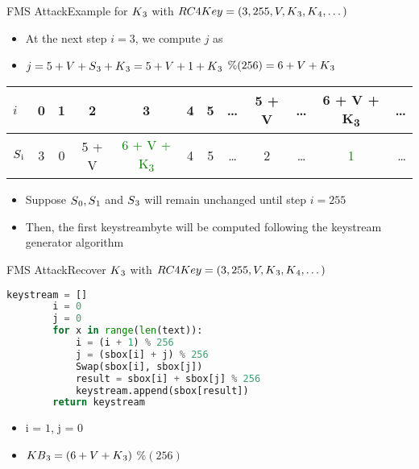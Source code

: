 \documentclass[
	aspectratio=169,	%
	onlytextwidth,		%
	t					%
	]{beamer}
\begin{document}
\begin{frame}[fragile]{FMS Attack}{Example for $K\textsubscript{3}$ with $RC4Key=(3,255,V,K\textsubscript{3},K\textsubscript{4},\dots)$}

	
	\begin{itemize}
		\item At the next step $i = 3$, we compute $j$ as
		\item $j = 5 + V + S\textsubscript{3} + K\textsubscript{3} = 5 + V + 1 + K\textsubscript{3}$ $\%(256) = 6 + V + K\textsubscript{3}$
	\end{itemize}
	
	\begin{table}[h!]
		\begin{center}
			\begin{tabular}{l|c|c|c|c|c|c|c|c|c|c|r}
			$i$ & 0 & 1 & 2 & 3 & 4 & 5 & \dots & 5 + V & \dots & 6 + V + K\textsubscript{3} & \dots\\
			\hline
			$S\textsubscript{i}$ & 3 & 0 & 5 + V & \textcolor{green}{6 + V + K\textsubscript{3}} & 4 & 5 & \dots & 2 & \dots & \textcolor{green}{1} & \dots\\
			\end{tabular}
		\end{center}
	\end{table}

	\begin{itemize}
		\item Suppose $S\textsubscript{0}, S\textsubscript{1}$ and $S\textsubscript{3}$ will remain unchanged until step $i = 255$
		\item Then, the first keystreambyte will be computed following the keystream generator algorithm
	\end{itemize}
\end{frame}

\begin{frame}[fragile]{FMS Attack}{Recover $K\textsubscript{3}$ with $RC4Key=(3,255,V,K\textsubscript{3},K\textsubscript{4},\dots)$}

	\begin{lstlisting}[language=Python]
		keystream = []
		i = 0
		j = 0
		for x in range(len(text)):
			i = (i + 1) % 256
			j = (sbox[i] + j) % 256
			Swap(sbox[i], sbox[j])
			result = sbox[i] + sbox[j] % 256
			keystream.append(sbox[result])   
		return keystream   
	\end{lstlisting}
	\begin{itemize}
		\item i = $1$, j = $0$
		\item $KB\textsubscript{3} = (6 + V + K\textsubscript{3})$ $\% (256)$
	\end{itemize}

\end{frame}
\end{document}

